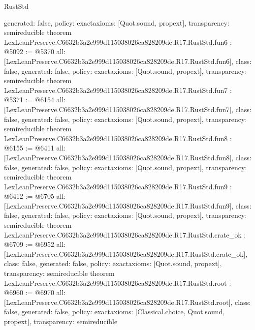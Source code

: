 \begin{lexlean}{RustStd}
\begin{coremodule}
{  generated: false,
  policy: exact{axioms: [Quot.sound, propext]},
  transparency: semireducible
}
theorem LexLeanPreserve.C6632b3a2e999d115038026ca828209de.R17.RustStd.fun6 : @5092 := @5370 {
  all: [LexLeanPreserve.C6632b3a2e999d115038026ca828209de.R17.RustStd.fun6],
  class: false,
  generated: false,
  policy: exact{axioms: [Quot.sound, propext]},
  transparency: semireducible
}
theorem LexLeanPreserve.C6632b3a2e999d115038026ca828209de.R17.RustStd.fun7 : @5371 := @6154 {
  all: [LexLeanPreserve.C6632b3a2e999d115038026ca828209de.R17.RustStd.fun7],
  class: false,
  generated: false,
  policy: exact{axioms: [Quot.sound, propext]},
  transparency: semireducible
}
theorem LexLeanPreserve.C6632b3a2e999d115038026ca828209de.R17.RustStd.fun8 : @6155 := @6411 {
  all: [LexLeanPreserve.C6632b3a2e999d115038026ca828209de.R17.RustStd.fun8],
  class: false,
  generated: false,
  policy: exact{axioms: [Quot.sound, propext]},
  transparency: semireducible
}
theorem LexLeanPreserve.C6632b3a2e999d115038026ca828209de.R17.RustStd.fun9 : @6412 := @6705 {
  all: [LexLeanPreserve.C6632b3a2e999d115038026ca828209de.R17.RustStd.fun9],
  class: false,
  generated: false,
  policy: exact{axioms: [Quot.sound, propext]},
  transparency: semireducible
}
theorem LexLeanPreserve.C6632b3a2e999d115038026ca828209de.R17.RustStd.crate_ok : @6709 := @6952 {
  all: [LexLeanPreserve.C6632b3a2e999d115038026ca828209de.R17.RustStd.crate_ok],
  class: false,
  generated: false,
  policy: exact{axioms: [Quot.sound, propext]},
  transparency: semireducible
}
theorem LexLeanPreserve.C6632b3a2e999d115038026ca828209de.R17.RustStd.root : @6960 := @6970 {
  all: [LexLeanPreserve.C6632b3a2e999d115038026ca828209de.R17.RustStd.root],
  class: false,
  generated: false,
  policy: exact{axioms: [Classical.choice, Quot.sound, propext]},
  transparency: semireducible
}


\end{coremodule}
\end{lexlean}

